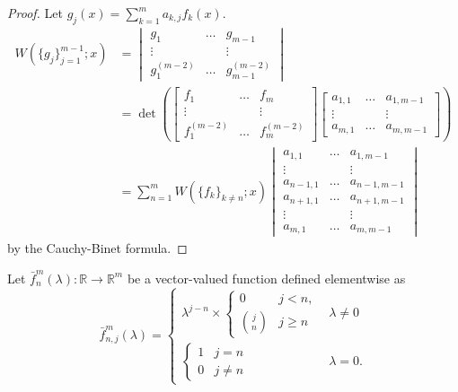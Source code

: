 \documentclass{book}
\begin{document}
\begin{proof}
Let $g_j(x) = \sum_{k=1}^m a_{k,j} f_k(x)$.
\begin{align*}
W(\{g_j\}_{j=1}^{m-1} ; x) & = \begin{vmatrix}
g_1 & \dots & g_{m-1} \\
\vdots & & \vdots \\
g_1^{(m-2)} & \dots & g_{m-1}^{(m-2)} \end{vmatrix} \\
& = \det \left ( \begin{bmatrix} f_1 & \dots & f_m \\ \vdots & & \vdots \\ f_1^{(m-2)} & \dots & f_m^{(m-2)} \end{bmatrix} \begin{bmatrix} a_{1,1} & \dots & a_{1,m-1} \\ \vdots & & \vdots \\ a_{m,1} & \dots & a_{m,m-1} \end{bmatrix} \right ) \\
& = \sum_{n=1}^{m} W(\{f_k\}_{k\neq n} ; x) \begin{vmatrix}
a_{1,1} & \dots & a_{1,m-1} \\
\vdots & & \vdots \\
a_{n-1,1} & \dots & a_{n-1,m-1} \\
a_{n+1,1} & \dots & a_{n+1,m-1} \\
\vdots & & \vdots \\
a_{m,1} & \dots & a_{m,m-1}
\end{vmatrix}
\end{align*}
by the Cauchy-Binet formula.
\end{proof}

\newcommand{\fmn}[2]{\bar{f}^{#2}_{#1}}


\begin{defn}
Let $\fmn{n}{m}(\lambda):\mathbb{R} \rightarrow \mathbb{R}^m$ be a vector-valued function defined elementwise as
\begin{equation*}
\fmn{n,j}{m}(\lambda) = \begin{cases} \lambda^{j-n} \times \begin{cases} 0 & j< n, \\ \binom{j}{n} & j \geq n \end{cases} & \lambda \neq 0 \\
\begin{cases} 1 & j = n \\ 0 & j \neq n \end{cases} & \lambda = 0. \end{cases}
\end{equation*}
\end{defn}
\end{document}
